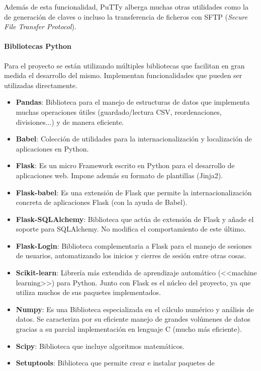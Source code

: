 Además de esta funcionalidad, PuTTy alberga muchas otras utilidades como la de
generación de claves o incluso la transferencia de ficheros con SFTP
(\textit{Secure File Transfer Protocol}).

\paragraph{Bibliotecas Python}
Para el proyecto se están utilizando múltiples bibliotecas que facilitan en gran
medida el desarrollo del mismo. Implementan funcionalidades que pueden ser
utilizadas directamente.

\begin{itemize}
	\item \textbf{Pandas}: Biblioteca para el manejo de estructuras de datos que
	implementa muchas operaciones útiles (guardado/lectura CSV, reordenaciones,
	divisiones...) y de manera eficiente.
	\item \textbf{Babel}: Colección de utilidades para la internacionalización y
	localización de aplicaciones en Python.
	\item \textbf{Flask}: Es un micro Framework escrito en Python para el
	desarrollo de aplicaciones web. Impone además su formato de plantillas
	(Jinja2).
	\item \textbf{Flask-babel}: Es una extensión de Flask que permite la
	internacionalización concreta de aplicaciones Flask (con la ayuda de Babel).
	\item \textbf{Flask-SQLAlchemy}: Biblioteca que actúa de extensión de Flask y
	añade el soporte para SQLAlchemy. No modifica el comportamiento de este
	último.
	\item \textbf{Flask-Login}: Biblioteca complementaria a Flask para el manejo
	de sesiones de usuarios, automatizando los inicios y cierres de sesión entre
	otras cosas.
	\item \textbf{Scikit-learn}: Librería más extendida de aprendizaje
	automático (<<machine learning>>) para Python. Junto con Flask es el núcleo
	del proyecto, ya que utiliza muchos de sus paquetes implementados.
	\item \textbf{Numpy}: Es una Biblioteca especializada en el cálculo numérico y
	análisis de datos. Se caracteriza por su eficiente manejo de grandes
	volúmenes de datos gracias a su parcial implementación en lenguaje C (mucho
	más eficiente).
	\item \textbf{Scipy}: Biblioteca que incluye algoritmos matemáticos.
	\item \textbf{Setuptools}: Biblioteca que permite crear e instalar paquetes de

\end{itemize}
